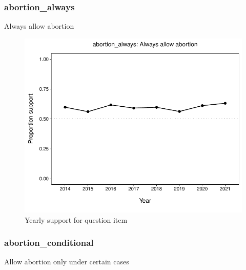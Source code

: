 \documentclass[
  12pt]{article}
\begin{document}
\hypertarget{abortion_always}{%
\subsubsection{abortion\_always}\label{abortion_always}}

Always allow abortion

\begin{figure}

{\centering \includegraphics{error-checking_files/figure-latex/unnamed-chunk-3-2} 

}

\caption{Yearly support for question item}\label{fig:unnamed-chunk-3-2}
\end{figure}

\hypertarget{abortion_conditional}{%
\subsubsection{abortion\_conditional}\label{abortion_conditional}}

Allow abortion only under certain cases
\end{document}
